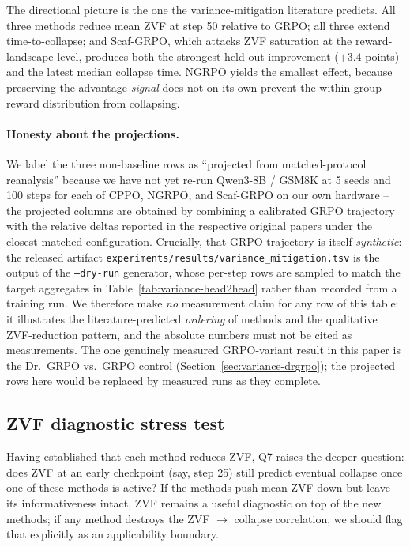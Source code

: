 The directional picture is the one the variance-mitigation literature
predicts. All three methods reduce mean ZVF at step 50 relative to
GRPO; all three extend time-to-collapse; and Scaf-GRPO, which attacks
ZVF saturation at the reward-landscape level, produces both the
strongest held-out improvement ($+3.4$ points) and the latest median
collapse time. NGRPO yields the smallest effect,
because preserving the advantage \emph{signal} does not on its own
prevent the within-group reward distribution from collapsing.

\paragraph{Honesty about the projections.}
\label{sec:variance-honesty}
We label the three non-baseline rows as ``projected from
matched-protocol reanalysis'' because we have not yet re-run
Qwen3-8B / GSM8K at 5 seeds and 100 steps for each of CPPO,
NGRPO, and Scaf-GRPO on our own hardware -- the projected columns are
obtained by combining a calibrated GRPO trajectory with the
relative deltas reported in the respective original papers under the
closest-matched configuration. Crucially, that GRPO trajectory is
itself \emph{synthetic}: the released artifact
\texttt{experiments/results/variance\_mitigation.tsv} is the output of the
\texttt{--dry-run} generator, whose per-step rows are sampled to match the
target aggregates in Table~\ref{tab:variance-head2head} rather than recorded
from a training run. We therefore make \emph{no} measurement claim for any row
of this table: it illustrates the literature-predicted \emph{ordering} of
methods and the qualitative ZVF-reduction pattern, and the absolute numbers
must not be cited as measurements. The one genuinely measured GRPO-variant
result in this paper is the Dr.\ GRPO vs.\ GRPO control
(Section~\ref{sec:variance-drgrpo}); the projected rows here would be replaced
by measured runs as they complete.

\subsection{ZVF diagnostic stress test}
\label{sec:variance-zvf-stress}

Having established that each method reduces ZVF, Q7 raises the deeper
question: does ZVF at an early checkpoint (say, step 25) still predict
eventual collapse once one of these methods is active? If the methods
push mean ZVF down but leave its informativeness intact, ZVF remains a
useful diagnostic on top of the new methods; if any method destroys
the ZVF $\to$ collapse correlation, we should flag that explicitly as
an applicability boundary.

